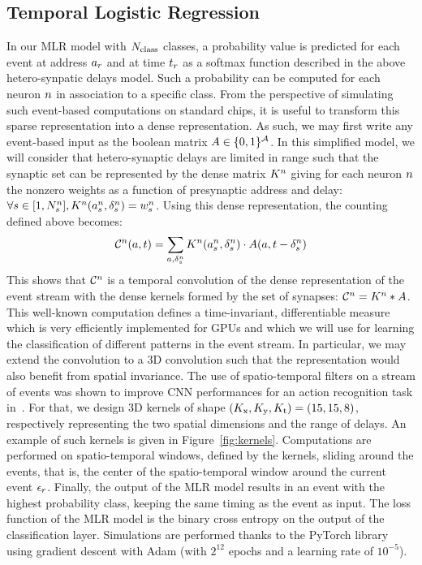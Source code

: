 \documentclass[default]{sn-jnl}%
\theoremstyle{thmstyleone}%
\theoremstyle{thmstyletwo}%
\theoremstyle{thmstylethree}%
\begin{document}
\subsection{
Temporal
Logistic Regression}
%
In our MLR model with $N_\text{class}$ classes, a probability value is predicted for each event at address $a_r$ and at time $t_r$ as a softmax function described in the above hetero-synpatic delays model. Such a probability can be computed for each neuron $n$ in association to a specific class. 
From the perspective of simulating such event-based computations on standard chips, it is useful to transform this sparse representation into a dense representation. As such, we may first write any event-based input as the boolean matrix $A \in \{0, 1 \}^{\mathcal{A}}$. In this simplified model, we will consider that hetero-synaptic delays are limited in range such that the synaptic set can be represented by the dense matrix $K^n$ giving for each neuron $n$ the nonzero weights as a function of presynaptic address and delay: $\forall {s\in [1,N_{s}^n]}, K^n(a_s^n, \delta_s^n) = w_s^n$. 
Using this dense representation, the counting defined above becomes:
$$
\mathcal{C}^n(a,t)
= \sum_{a, \delta_s^n} K^n(a_s^n, \delta_s^n) \cdot A(a, t-\delta_s^n)
$$
%
This shows that $\mathcal{C}^n$ is a temporal convolution of the dense representation of the event stream with the dense kernels formed by the set of synapses:  $\mathcal{C}^n = K^n \ast A$.
This well-known computation defines a time-invariant, differentiable measure which is very efficiently implemented for GPUs and which we will use for learning the classification of different patterns in the event stream.
%
In particular, we may extend the convolution to a 3D convolution 
such that the representation would also benefit from spatial invariance. The use of spatio-temporal filters on a stream of events was shown to improve CNN performances for an action recognition task in~\cite{ghosh2022conv3D}.
For that, we design 3D kernels of shape  $(K_\text{x}, K_\text{y}, K_\text{t}) = (15, 15, 8)$, respectively representing the two spatial dimensions and the range of delays. An example of such kernels is given in Figure~\ref{fig:kernels}.
Computations are performed on spatio-temporal windows, defined by the kernels, sliding around the events, that is, the center of the spatio-temporal window around the current event $\epsilon_r$.
%
Finally, the output of the MLR model results in an event with the highest probability class, keeping the same timing as the event as input.
%
The loss function of the MLR model is the binary cross entropy on the output of the classification layer. Simulations are performed thanks to the PyTorch library using gradient descent with Adam (with $2^{12}$ epochs and a learning rate of $10^{-5}$). 
%
\end{document}
